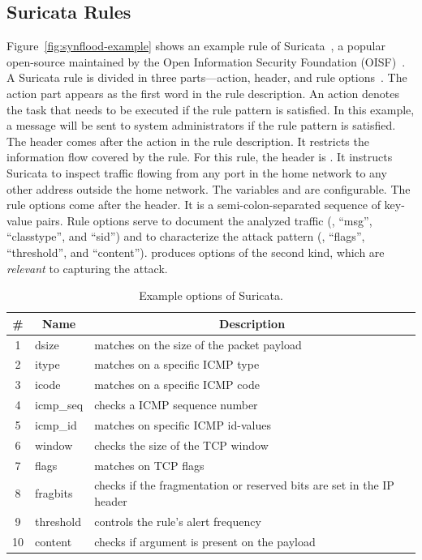 \documentclass[sigconf,anonymous]{acmart}
\begin{document}
\subsection{Suricata Rules}
\label{sec:example-suricata-rules}

Figure~\ref{fig:synflood-example} shows an example rule of
Suricata~\cite{suricata}, a popular open-source \nids{} maintained by
the Open Information Security Foundation (OISF)~\cite{oisf}. A
Suricata rule is divided in three parts---action, header, and rule
options~\cite{suri-rule-format}. The action part appears as the first
word in the rule description. An action denotes the task that needs to
be executed if the rule pattern is satisfied. In this example, a
message will be sent to system administrators if the rule pattern is
satisfied. The header comes after the action in the rule
description. It restricts the information flow covered by the
rule. For this rule, the header is . It instructs Suricata to inspect 
traffic flowing from any port in the home network to any other address
outside the home network. The variables  and
 are configurable. The rule options come after
the header. It is a semi-colon-separated sequence of key-value
pairs. Rule options serve to document the analyzed traffic (\eg{},
``msg'', ``classtype'', and ``sid'') and to characterize the attack
pattern (\eg, ``flags'', ``threshold'', and ``content''). \tname{}
produces options of the second kind, which are \emph{relevant} to
capturing the attack.

\begin{table}[t!]
  \caption{\label{table:rules}Example options of Suricata.}  
  \centering
  \begin{tabular}{clp{5.5cm}}
    \toprule
    \multicolumn{1}{c}{\#} & \multicolumn{1}{c}{Name} &  \multicolumn{1}{c}{Description}\\
    \midrule     
    1 & dsize & matches on the size of the packet payload\\
    2 & itype &  matches on a specific ICMP type\\
    3 & icode & matches on a specific ICMP code\\
    4 & icmp\_seq  & checks a ICMP sequence number\\
    5 & icmp\_id & matches on specific ICMP id-values\\
    6 & window & checks the size of the TCP window\\
    7 & flags & matches on TCP flags\\
    8 & fragbits & checks if the fragmentation or reserved bits are set in the IP header\\
    9 & threshold & controls the rule’s alert frequency\\
    10 & content & checks if argument is present on the payload\\
    \bottomrule
  \end{tabular}
\end{table}
\end{document}
